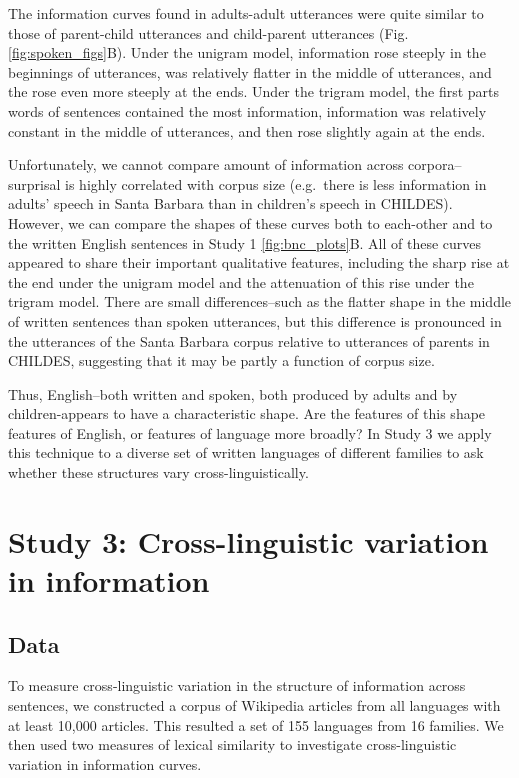 \documentclass[10pt, letterpaper]{article}
\begin{document}
The information curves found in adults-adult utterances were quite
similar to those of parent-child utterances and child-parent utterances
(Fig. \ref{fig:spoken_figs}B). Under the unigram model, information rose
steeply in the beginnings of utterances, was relatively flatter in the
middle of utterances, and the rose even more steeply at the ends. Under
the trigram model, the first parts words of sentences contained the most
information, information was relatively constant in the middle of
utterances, and then rose slightly again at the ends.

Unfortunately, we cannot compare amount of information across
corpora--surprisal is highly correlated with corpus size (e.g.~there is
less information in adults' speech in Santa Barbara than in children's
speech in CHILDES). However, we can compare the shapes of these curves
both to each-other and to the written English sentences in Study 1
\ref{fig:bnc_plots}B. All of these curves appeared to share their
important qualitative features, including the sharp rise at the end
under the unigram model and the attenuation of this rise under the
trigram model. There are small differences--such as the flatter shape in
the middle of written sentences than spoken utterances, but this
difference is pronounced in the utterances of the Santa Barbara corpus
relative to utterances of parents in CHILDES, suggesting that it may be
partly a function of corpus size.

Thus, English--both written and spoken, both produced by adults and by
children-appears to have a characteristic shape. Are the features of
this shape features of English, or features of language more broadly? In
Study 3 we apply this technique to a diverse set of written languages of
different families to ask whether these structures vary
cross-linguistically.

\hypertarget{study-3-cross-linguistic-variation-in-information}{%
\section{Study 3: Cross-linguistic variation in
information}\label{study-3-cross-linguistic-variation-in-information}}

\hypertarget{data-2}{%
\subsection{Data}\label{data-2}}

To measure cross-linguistic variation in the structure of information
across sentences, we constructed a corpus of Wikipedia articles from all
languages with at least 10,000 articles. This resulted a set of 155
languages from 16 families. We then used two measures of lexical
similarity to investigate cross-linguistic variation in information
curves.
\end{document}
